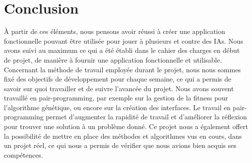 \section{Conclusion}

À partir de ces éléments, nous pensons avoir réussi à créer une application fonctionnelle pouvant être utilisée pour jouer à plusieurs et contre des IAs. Nous avons suivi au maximum ce qui a été établi dans le cahier des charges en début de projet, de manière à fournir une application fonctionnelle et utilisable. 
Concernant la méthode de travail employée durant le projet, nous nous sommes fixé des objectifs de développement pour chaque semaine, ce qui a permis de savoir sur quoi travailler et de suivre l'avancée du projet. Nous avons souvent travaillé en pair-programming, par exemple sur la gestion de la fitness pour l'algorithme génétique, ou encore sur la création des interfaces.
Le travail en pair-programming permet d'augmenter la rapidité de travail et d'améliorer la réflexion pour trouver une solution à un problème donné.
Ce projet nous a également offert la possibilité de mettre en place des méthodes et algorithmes vus en cours, dans un projet réel, ce qui nous a permis de vérifier que nous avions bien acquis ses compétences.